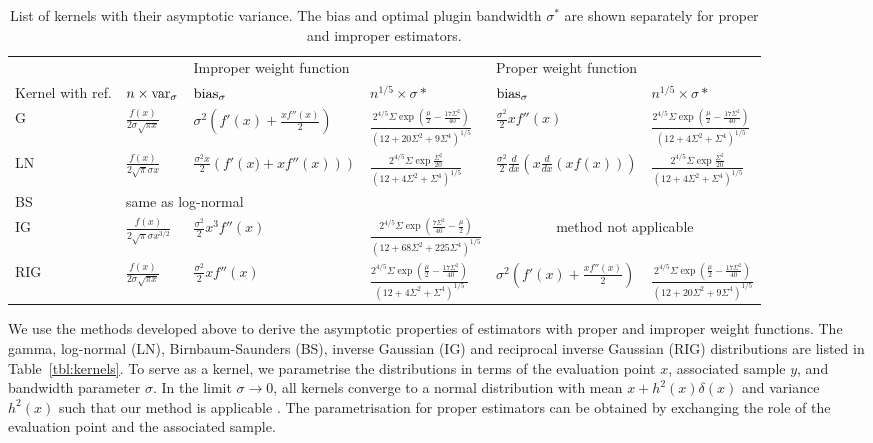 \begin{table}
\begin{tabular*}{1\textheight}{@{\extracolsep{\fill}}llllll}
 &  & \multicolumn{2}{l}{Improper weight function} & \multicolumn{2}{l}{Proper weight function}\tabularnewline
Kernel with ref. & $n\times\mathrm{var}_{\sigma}$  & $\mathrm{bias}_{\sigma}$  & $n^{1/5}\times\sigma*$ & $\mathrm{bias}_{\sigma}$  & $n^{1/5}\times\sigma*$\tabularnewline
\hline 
G \citep{Chen2000,Jeon2014} & $\frac{f(x)}{2\sigma\sqrt{\pi x}}$  & $\sigma^{2}\left(f'(x)+\frac{xf''(x)}{2}\right)$ & $\frac{2^{4/5}\Sigma\exp\left(\frac{\mu}{2}-\frac{17\Sigma^{2}}{40}\right)}{\left(12+20\Sigma^{2}+9\Sigma^{4}\right)^{1/5}}$ & $\frac{\sigma^{2}}{2}xf''\left(x\right)$ & $\frac{2^{4/5}\Sigma\exp\left(\frac{\mu}{2}-\frac{17\Sigma^{2}}{40}\right)}{\left(12+4\Sigma^{2}+\Sigma^{4}\right)^{1/5}}$\tabularnewline
LN \citep{Jin2003} & $\frac{f(x)}{2\sqrt{\pi}\sigma x}$  & $\frac{\sigma^{2}x}{2}\left(f'\left(x)+xf''\left(x\right)\right)\right)$ & $\frac{2^{4/5}\Sigma\exp\frac{\Sigma^{2}}{20}}{\left(12+4\Sigma^{2}+\Sigma^{4}\right)^{1/5}}$ & $\frac{\sigma^{2}}{2}\frac{d}{dx}\left(x\frac{d}{dx}\left(xf\left(x\right)\right)\right)$ & $\frac{2^{4/5}\Sigma\exp\frac{\Sigma^{2}}{20}}{\left(12+4\Sigma^{2}+\Sigma^{4}\right)^{1/5}}$\tabularnewline
BS \citep{Jin2003} & \multicolumn{5}{l}{same as log-normal}\tabularnewline
IG \citep{Scaillet2004} & $\frac{f(x)}{2\sqrt{\pi}\sigma x^{3/2}}$  & $\frac{\sigma^{2}}{2}x^{3}f''\left(x\right)$ & $\frac{2^{4/5}\Sigma\exp\left(\frac{7\Sigma^{2}}{40}-\frac{\mu}{2}\right)}{\left(12+68\Sigma^{2}+225\Sigma^{4}\right)^{1/5}}$ & \multicolumn{2}{c}{method not applicable}\tabularnewline
RIG \citep{Scaillet2004} & $\frac{f(x)}{2\sigma\sqrt{\pi x}}$  & $\frac{\sigma^{2}}{2}xf''\left(x\right)$ & $\frac{2^{4/5}\Sigma\exp\left(\frac{\mu}{2}-\frac{17\Sigma^{2}}{40}\right)}{\left(12+4\Sigma^{2}+\Sigma^{4}\right)^{1/5}}$ & $\sigma^{2}\left(f'(x)+\frac{xf''(x)}{2}\right)$ & $\frac{2^{4/5}\Sigma\exp\left(\frac{\mu}{2}-\frac{17\Sigma^{2}}{40}\right)}{\left(12+20\Sigma^{2}+9\Sigma^{4}\right)^{1/5}}$\tabularnewline
\end{tabular*}

\vspace{2em}
\caption{\label{tbl:asymptotic-properties}List of kernels with their asymptotic variance. The bias and optimal plugin bandwidth $\sigma^{*}$ are shown separately for proper and improper estimators. }
\end{table}
We use the methods developed above to derive the asymptotic properties of estimators with proper and improper weight functions. The gamma, log-normal (LN), Birnbaum-Saunders (BS), inverse Gaussian (IG) and reciprocal inverse Gaussian (RIG) distributions are listed in Table~\ref{tbl:kernels}. To serve as a kernel, we parametrise the distributions in terms of the evaluation point $x$, associated sample $y$, and bandwidth parameter $\sigma$. In the limit $\sigma\rightarrow0$, all kernels converge to a normal distribution with mean $x+h^{2}\left(x\right)\delta\left(x\right)$ and variance $h^{2}\left(x\right)$ such that our method is applicable \citep{Johnson1994}. The parametrisation for proper estimators can be obtained by exchanging the role of the evaluation point and the associated sample.


